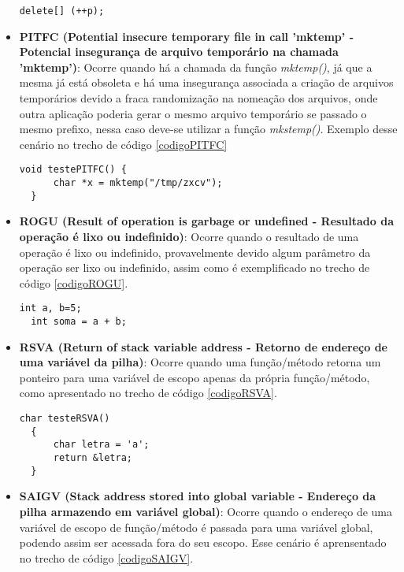 \begin{itemize}
\begin{lstlisting}[caption={Código exemplo OSF}, label=codigoOSF]
  delete[] (++p);
    \end{lstlisting}
  \item \textbf{PITFC (Potential insecure temporary file in call 'mktemp' - Potencial insegurança de arquivo temporário na
    chamada 'mktemp')}: Ocorre quando há a chamada da função \textit{mktemp()}, já que a mesma já está obsoleta e há uma 
    insegurança associada a criação de arquivos temporários devido a fraca randomização na nomeação dos arquivos, onde outra
    aplicação poderia gerar o mesmo arquivo temporário se passado o mesmo prefixo, nessa caso deve-se utilizar a função 
    \textit{mkstemp()}. Exemplo desse cenário no trecho de código \ref{codigoPITFC}

    \begin{lstlisting}[caption={Código exemplo PITFC}, label=codigoPITFC]
  void testePITFC() {
      char *x = mktemp("/tmp/zxcv"); 
  }
    \end{lstlisting}
  \item \textbf{ROGU (Result of operation is garbage or undefined - Resultado da operação é lixo ou indefinido)}: Ocorre quando
    o resultado de uma operação é lixo ou indefinido, provavelmente devido algum parâmetro da operação ser lixo ou indefinido, 
    assim como é exemplificado no trecho de código \ref{codigoROGU}.

    \begin{lstlisting}[caption={Código exemplo ROGU}, label=codigoROGU]
  int a, b=5;
  int soma = a + b;
    \end{lstlisting}
  \item \textbf{RSVA (Return of stack variable address - Retorno de endereço de uma variável da pilha)}: Ocorre quando uma
    função/método retorna um ponteiro para uma variável de escopo apenas da própria função/método, como apresentado no trecho
    de código \ref{codigoRSVA}.

    \begin{lstlisting}[caption={Código exemplo RSVA}, label=codigoRSVA]
  char testeRSVA()
  {
      char letra = 'a';
      return &letra;
  }
    \end{lstlisting}
  \item \textbf{SAIGV (Stack address stored into global variable - Endereço da pilha armazendo em variável global)}: Ocorre
    quando o endereço de uma variável de escopo de função/método é passada para uma variável global, podendo assim ser acessada 
    fora do seu escopo. Esse cenário é aprensentado no trecho de código \ref{codigoSAIGV}.


\end{itemize}
